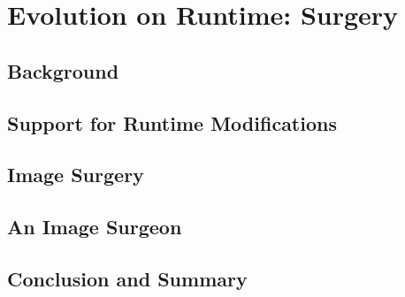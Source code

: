 
\chapter{Evolution on Runtime: Surgery}
\minitoc
\introduction


\section{Background}

\section{Support for Runtime Modifications}

\section{Image Surgery}

\section{An Image Surgeon}

\section{Conclusion and Summary}

